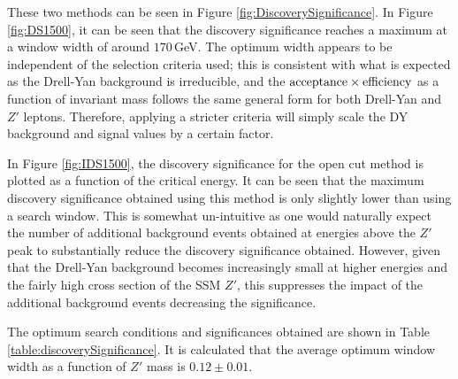 \documentclass{article}
\begin{document}
These two methods can be seen in Figure \ref{fig:DiscoverySignificance}. In Figure \ref{fig:DS1500}, it can be seen that the discovery significance reaches a maximum at a window width of around $170\,$GeV. The optimum width appears to be independent of the selection criteria used; this is consistent with what is expected as the Drell-Yan background is irreducible, and the $\rm{acceptance}\times\rm{efficiency}$ as a function of invariant mass follows the same general form for both Drell-Yan and $Z'$ leptons. Therefore, applying a stricter criteria will simply scale the DY background and signal values by a certain factor. 


In Figure \ref{fig:IDS1500}, the discovery significance for the open cut method is plotted as a function of the critical energy. It can be seen that the maximum discovery significance obtained using this method is only slightly lower than using a search window. This is somewhat un-intuitive as one would naturally expect the number of additional background events obtained at energies above the $Z'$ peak to substantially reduce the discovery significance obtained. However, given that the Drell-Yan background becomes increasingly small at higher energies and the fairly high cross section of the SSM $Z'$, this suppresses the impact of the additional background events decreasing the significance.

The optimum search conditions and significances obtained are shown in Table \ref{table:discoverySignificance}. It is calculated that the average optimum window width as a function of $Z'$ mass is $0.12\pm0.01$.
\end{document}
